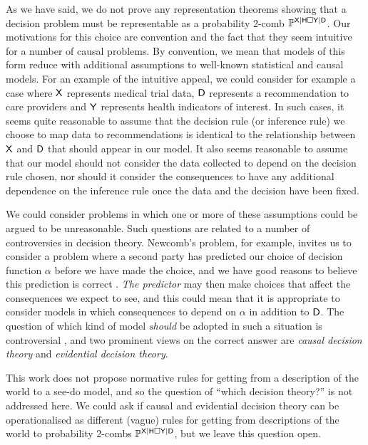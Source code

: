 As we have said, we do not prove any representation theorems showing that a decision problem must be representable as a probability 2-comb $\mathbb{P}^{\mathsf{X}|\mathsf{H}\square \mathsf{Y}|\mathsf{D}}$. Our motivations for this choice are convention and the fact that they seem intuitive for a number of causal problems. By convention, we mean that models of this form reduce with additional assumptions to well-known statistical and causal models. For an example of the intuitive appeal, we could consider for example a case where $\mathsf{X}$ represents medical trial data, $\mathsf{D}$ represents a recommendation to care providers and $\mathsf{Y}$ represents health indicators of interest. In such cases, it seems quite reasonable to assume that the decision rule (or inference rule) we choose to map data to recommendations is identical to the relationship between $\mathsf{X}$ and $\mathsf{D}$ that should appear in our model. It also seems reasonable to assume that our model should not consider the data collected to depend on the decision rule chosen, nor should it consider the consequences to have any additional dependence on the inference rule once the data and the decision have been fixed.

We could consider problems in which one or more of these assumptions could be argued to be unreasonable. Such questions are related to a number of controversies in decision theory. Newcomb's problem, for example, invites us to consider a problem where a second party has predicted our choice of decision function $\alpha$ before we have made the choice, and we have good reasons to believe this prediction is correct \citep{nozick_newcombs_1969}. \emph{The predictor} may then make choices that affect the consequences we expect to see, and this could mean that it is appropriate to consider models in which consequences to depend on $\alpha$ in addition to $\mathsf{D}$. The question of which kind of model \emph{should} be adopted in such a situation is controversial \citet{weirich_causal_2016,lewis_causation_1986}, and two prominent views on the correct answer are \emph{causal decision theory} and \emph{evidential decision theory}.

This work does not propose normative rules for getting from a description of the world to a see-do model, and so the question of ``which decision theory?'' is not addressed here. We could ask if causal and evidential decision theory can be operationalised as different (vague) rules for getting from descriptions of the world to probability 2-combs $\mathbb{P}^{\mathsf{X}|\mathsf{H}\square \mathsf{Y}|\mathsf{D}}$, but we leave this question open.

